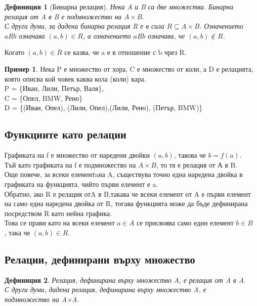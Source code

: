 \documentclass[fleqn, 12pt]{article}
\newtheorem{definition}{Дефиниция}[subsection]
\theoremstyle{definition}
\newtheorem{example}{Пример}[subsection]
\begin{document}
\begin{definition}[Бинарна релация]
Нека A и B са две множества. Бинарна релация от A в B е подмножество на $A \times B$. \\
С други думи, за дадена бинарна релация R е в сила $R \subseteq A \times B$.
Означението $aRb$ означава $(a, b) \in R$, а означението $a \underline{R} b$ означава, че $(a, b) \notin R$.
\end{definition}
Когато  $(a, b) \in R$ се казва, че a е в отношение с b чрез R.\\

\begin{example}
Нека P е множество от хора, C е множество от коли, а D е релацията, която описва кой човек каква кола (коли) кара.\\
P = \{Иван, Лили, Петър, Валя\},\\
C = \{Опел, BMW, Рено\}\\
D = \{(Иван, Опел), (Лили, Опел),(Лили, Рено), (Петър, BMW)\}
\end{example}

\subsection{Функциите като релации}
Графиката на f е множество от наредени двойки $(a, b)$, такова че $b = f(a)$.\\
Тъй като графиката на f е подмножество на $A \times B$, то тя е релация от А в B. \\
Още повече, за всеки елементaна A, съществува точно една наредена двойка в графиката на функцията, чийто първи елемент е a.\\
Обратно, ако R е релация отA в B,такава че всеки елемент от A е първи елемент на само една наредена двойка от R, тогава функцията може да бъде дефинирана посредством R като нейна графика. \\
Това се прави като на всеки елемент $a \in A$ се присвоява само един елемент $b \in B$, така че $(a, b) \in R$.

\subsection{Релации, дефинирани върху множество}

\begin{definition}
Релация, дефинирана върху множество A, е релация от A в A.\\
С други думи, дадена релация, дефинирана върху множество A, е подмножество на A×A.
\end{definition}
\end{document}
